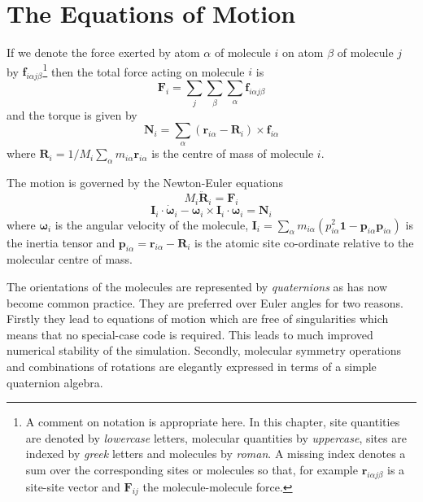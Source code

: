 \documentclass[a4paper,twoside]{report}
\providecommand{\bm}[1]{\mathbf{#1}}
\begin{document}
\section{The Equations of Motion}  %
If we denote the force exerted by atom $\alpha$ of molecule $i$ on
atom $\beta$ of molecule $j$ by $\bm{f}_{i\alpha j\beta}$\footnote{A
comment on notation is appropriate here.  In this chapter, site
quantities are denoted by \emph{lowercase} letters, molecular
quantities by \emph{uppercase}, sites are indexed by \emph{greek}
letters and molecules by \emph{roman}. A missing index denotes a sum
over the corresponding sites or molecules so that, for example
$\bm{r}_{i\alpha j\beta}$ is a site-site vector and $\bm{F}_{ij}$ the
molecule-molecule force.}  then the total force acting on molecule $i$
is
\begin{equation}
\label{eqn:comf}
\bm{F}_i = \sum_j \sum_\beta \sum_\alpha \bm{f}_{i\alpha j\beta}
\end{equation}
and the torque is given by
\begin{equation}
\label{eqn:comt}
\bm{N}_i = \sum_\alpha (\bm{r}_{i \alpha} - \bm{R}_{i}) 
\times\bm{f}_{i\alpha} 
\end{equation}
where $\bm{R}_{i} = 1/M_i \sum_\alpha
m_{i\alpha} \bm{r}_{i\alpha}$ is the centre of mass of molecule $i$.

The motion is governed by the Newton-Euler equations
\begin{equation}
M_i\ddot{\bm{R}}_i = \bm{F}_i \label{eqn:newton}
\end{equation}
\begin{equation}
  \bm{I}_i \cdot \dot{\bm{\omega}}_i - \bm{\omega}_i \times \bm{I}_i
  \cdot \bm{\omega}_i = \bm{N}_i \label{eqn:euler}
\end{equation}
where  $\bm{\omega}_i$ is the angular velocity of the molecule, 
$ \bm{I}_i = \sum_{\alpha} m_{i\alpha} 
( p_{i\alpha}^2 \bm{1} - \bm{p}_{i\alpha}\bm{p}_{i\alpha} ) $ 
is the inertia tensor and 
$\bm{p}_{i\alpha} = \bm{r}_{i\alpha} - \bm{R}_i $
is the atomic site co-ordinate relative to the molecular centre of mass.

\label{sec:quaternions}
The orientations of the molecules are represented by \emph{quaternions}
as  has now  become common  practice.   They are  preferred over Euler
angles for two reasons. Firstly they lead to equations of motion which
are  free  of singularities\cite{evans:77} which   means  that   no
special-case  code is required. This  leads to much improved numerical
stability      of  the  simulation\cite{evans:77b}.   Secondly,
molecular symmetry   operations   and  combinations of  rotations  are
elegantly expressed   in    terms  of     a     simple      quaternion
algebra\cite{evans:77b,pawley:85b}.
\end{document}

